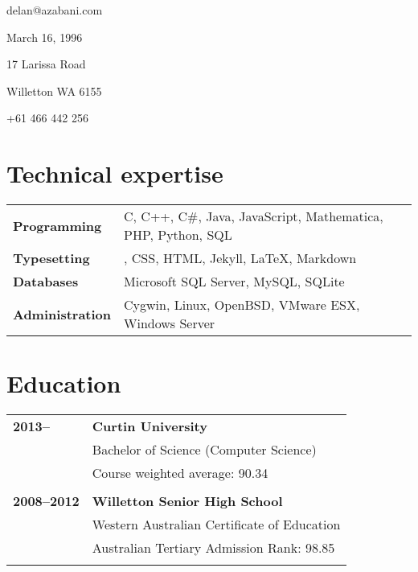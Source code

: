 \documentclass[a4paper,12pt]{article}
\begin{document}
\hrulefill

\hspace{1cm}\begin{minipage}{7cm}
	{\Huge delan\textcolor{lg}@azabani\textcolor{lg}{.com}}
\end{minipage}\hfill\begin{minipage}{4cm}
	\hfill	March 16, 1996		\par
	\hfill	17 Larissa Road		\par
	\hfill	Willetton WA 6155	\par
	\hfill	+61 466 442 256		\par
\end{minipage}\hspace{1cm}

\hrulefill

\section*{Technical expertise}

\begin{tabular}{p{3.5cm}p{12.5cm}}
	\textbf{Programming} &
		C, C++, C\#, Java, JavaScript, Mathematica, PHP, Python, SQL \\
	\textbf{Typesetting} &
		\BibTeX, CSS, HTML, Jekyll, \LaTeX, Markdown \\
	\textbf{Databases} &
		Microsoft SQL Server, MySQL, SQLite \\
	\textbf{Administration} &
		Cygwin, Linux, OpenBSD, VMware ESX, Windows Server
\end{tabular}

\section*{Education}

\begin{tabular}{p{3.5cm}p{12.5cm}}
	\textbf{2013--} &
		\textbf{Curtin University}\\
		& Bachelor of Science (Computer Science)\\
		& Course weighted average: 90.34\\\\
	\textbf{2008--2012} &
		\textbf{Willetton Senior High School}\\
		& Western Australian Certificate of Education\\
		& Australian Tertiary Admission Rank: 98.85\\\\
\end{tabular}
\end{document}
